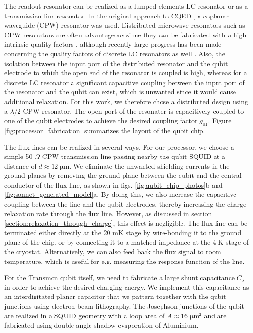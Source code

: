 The readout resonator can be realized as a lumped-elements LC resonator or as a transmission line resonator. In the original approach to CQED \citep{wallraff_strong_2004}, a coplanar waveguide (CPW) resonator was used. Distributed microwave resonators such as CPW resonators are often advantageous since they can be fabricated with a high intrinsic quality factors \citep{megrant_planar_2012,creedon_high_2011,wang_improving_2009,barends_minimal_2010}, although recently large progress has been made concerning the quality factors of discrete LC resonators as well \citep{khalil_loss_2011}. Also, the isolation between the input port of the distributed resonator and the qubit electrode to which the open end of the resonator is coupled is high, whereas for a discrete LC resonator a significant capacitive coupling between the input port of the resonator and the qubit can exist, which is unwanted since it would cause additional relaxation. For this work, we therefore chose a distributed design using a $\lambda/2$ CPW resonator. The open port of the resonator is capacitively coupled to one of the qubit electrodes to achieve the desired coupling factor $g_{01}$. Figure \ref{fig:processor_fabrication} summarizes the layout of the qubit chip.

\smallskip

The flux lines can be realized in several ways. For our processor, we choose a simple 50 $\Omega$ CPW transmission line passing nearby the qubit SQUID at a distance of $d\approx 12\;\mathrm{\mu m}$. We eliminate the unwanted shielding currents in the ground planes by removing the ground plane between the qubit and the central conductor of the flux line, as shown in figs. \ref{fig:qubit_chip_photos}b and \ref{fig:sonnet_generated_model}a. By doing this, we also increase the capacitive coupling between the line and the qubit electrodes, thereby increasing the charge relaxation rate through the flux line. However, as discussed in section \ref{section:relaxation_through_charge}, this effect is negligible. The flux line can be terminated either directly at the 20 mK stage by wire-bonding it to the ground plane of the chip, or by connecting it to a matched impedance at the 4 K stage of the cryostat. Alternatively, we can also feed back the flux signal to room temperature, which is useful for e.g. measuring the response function of the line.

\smallskip

For the Transmon qubit itself, we need to fabricate a large shunt capacitance $C_J$ in order to achieve the desired charging energy. We implement this capacitance as an interdigitated planar capacitor that we pattern together with the qubit junctions using electron-beam lithography. The Josephson junctions of the qubit are realized in a SQUID geometry with a loop area of $A\approx 16\;\mathrm{\mu m}^2$ and are fabricated using double-angle shadow-evaporation of Aluminium.

